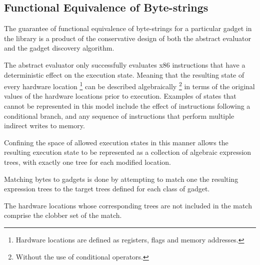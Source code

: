 \documentclass[finalcopy,short]{srpaper}
\begin{document}
        \subsection{Functional Equivalence of Byte-strings}
        \label{sec:results-gadget-inst-eq}


            The guarantee of functional equivalence of byte-strings for a
            particular gadget in the library is a product of the conservative
            design of both the abstract evaluator and the gadget discovery
            algorithm.

            The abstract evaluator only successfully evaluates x86 instructions
            that have a deterministic effect on the execution state.  Meaning
            that the resulting state of every hardware location
            \footnote{Hardware locations are defined as registers, flags and
            memory addresses.} can be described algebraically \footnote{Without
            the use of conditional operators.} in terms of the original values
            of the hardware locations prior to execution. Examples of states
            that cannot be represented in this model include the effect of
            instructions following a conditional branch, and any sequence of
            instructions that perform multiple indirect writes to memory.

            Confining the space of allowed execution states in this manner
            allows the resulting execution state to be represented as a
            collection of algebraic expression trees, with exactly one tree for
            each modified location.

            Matching bytes to gadgets is done by attempting to match one the
            resulting expression trees to the target trees defined for each
            class of gadget. 
            
            The hardware locations whose corresponding trees
            are not included in the match comprise the clobber set of the match.

\end{document}
